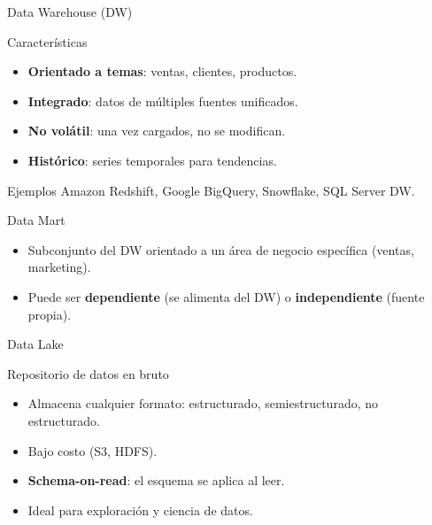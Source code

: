 \documentclass[aspectratio=169, 10pt, xcolor=table]{beamer}
\begin{document}
\begin{frame}{Data Warehouse (DW)}
    \begin{block}{Características}
        \begin{itemize}
            \item \textbf{Orientado a temas}: ventas, clientes, productos.
            \item \textbf{Integrado}: datos de múltiples fuentes unificados.
            \item \textbf{No volátil}: una vez cargados, no se modifican.
            \item \textbf{Histórico}: series temporales para tendencias.
        \end{itemize}
    \end{block}
    \begin{exampleblock}{Ejemplos}
        Amazon Redshift, Google BigQuery, Snowflake, SQL Server DW.
    \end{exampleblock}
\end{frame}

\begin{frame}{Data Mart}
    \begin{itemize}
        \item Subconjunto del DW orientado a un área de negocio específica (ventas, marketing).
        \item Puede ser \textbf{dependiente} (se alimenta del DW) o \textbf{independiente} (fuente propia).
    \end{itemize}
\end{frame}

\begin{frame}{Data Lake}
    \begin{block}{Repositorio de datos en bruto}
        \begin{itemize}
            \item Almacena cualquier formato: estructurado, semiestructurado, no estructurado.
            \item Bajo costo (S3, HDFS).
            \item \textbf{Schema-on-read}: el esquema se aplica al leer.
            \item Ideal para exploración y ciencia de datos.
        \end{itemize}
    \end{block}
\end{frame}
\end{document}
